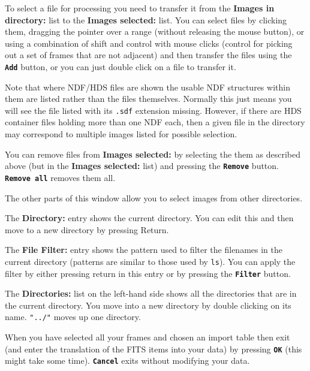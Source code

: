 \documentclass[11pt]{article}
\newcommand{\xlabel}[1]{}
\newcommand{\butt}[1]{{\bf \tt #1}}
\newcommand{\wlab}[1]{{\bf #1}}
\newcommand{\text}[1]{{\tt #1}}
\begin{document}
To select a file for processing you need to transfer it from the
\wlab{Images in directory:} list to the \wlab{Images selected:} list.
You can select files by clicking them, dragging the pointer over
a range (without releasing the mouse button), or using a combination
of shift and control with mouse clicks (control for picking out a set of
frames that are not adjacent) and then transfer the files using the
\butt{Add} button, or you can just double click on a file to transfer it.

Note that where NDF/HDS files are shown the usable NDF structures
within them are listed rather than the files themselves.
Normally this just means you will see the file listed 
with its \text{.sdf} extension missing.  However, if there are HDS
container files holding more than one NDF each, then a given
file in the directory may correspond to multiple images listed
for possible selection.

You can remove files from \wlab{Images selected:} by selecting the
them as described above (but in the \wlab{Images selected:} list) and
pressing the \butt{Remove} button. \butt{Remove all} removes them all.

The other parts of this window allow you to select images from other
directories.


The\xlabel{CCDFITSImportDirectory} \wlab{Directory:} entry shows the
current directory. You can edit this and then move to a new directory
by pressing Return.


The\xlabel{CCDFITSImportFilter} \wlab{File Filter:} entry shows the
pattern used to filter the filenames in the current directory
(patterns are similar to those used by \text{ls}). You can apply the
filter by either pressing return in this entry or by pressing the
\butt{Filter} button.


The\xlabel{CCDFITSImportDirectories} \wlab{Directories:} list on the
left-hand side shows all the directories that are in the current
directory. You move into a new directory by double clicking on its
name. \text{"../"} moves up one directory.


When\xlabel{CCDFITSImportChoice} you have selected all your frames and
chosen an import table then exit (and enter the translation of the
FITS items into your data) by pressing \butt{OK} (this might take some
time).
\butt{Cancel} exits without modifying your data.
\end{document}
